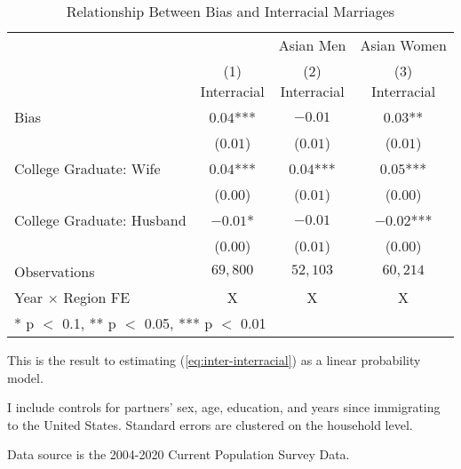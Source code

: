 \begin{table}[H]
\centering\centering
\caption{Relationship Between Bias and Interracial Marriages \label{regtab-logit-02}}
\centering
\begin{threeparttable}
\begin{tabular}[t]{lccc}
\toprule
\multicolumn{2}{c}{ } & \multicolumn{1}{c}{Asian Men} & \multicolumn{1}{c}{Asian Women} \\
\cmidrule(l{3pt}r{3pt}){3-3} \cmidrule(l{3pt}r{3pt}){4-4}
  & \specialcell{(1) \\ Interracial} & \specialcell{(2) \\ Interracial} & \specialcell{(3) \\ Interracial}\\
\midrule
Bias & $0.04$*** & $-0.01$ & $0.03$**\\
 & ($0.01$) & ($0.01$) & ($0.01$)\\
College Graduate: Wife & $0.04$*** & $0.04$*** & $0.05$***\\
 & ($0.00$) & ($0.01$) & \vphantom{1} ($0.00$)\\
College Graduate: Husband & $-0.01$* & $-0.01$ & $-0.02$***\\
 & ($0.00$) & ($0.01$) & ($0.00$)\\
\midrule
Observations & $69,800$ & $52,103$ & $60,214$\\
Year $\times$ Region FE & X & X & X\\
\bottomrule
\multicolumn{4}{l}{\rule{0pt}{1em}* p $<$ 0.1, ** p $<$ 0.05, *** p $<$ 0.01}\\
\end{tabular}
\begin{tablenotes}
\small
\item[1] \footnotesize{This is the result to estimating (\ref{eq:inter-interracial}) as a
                      linear probability model.}
\item[2] \footnotesize{I include controls for partners' sex, age, education, 
                      and years since immigrating to the United States.
                      Standard errors are clustered on the household level.}
\item[3] \footnotesize{Data source is the 2004-2020 Current Population Survey Data.}
\end{tablenotes}
\end{threeparttable}
\end{table}
